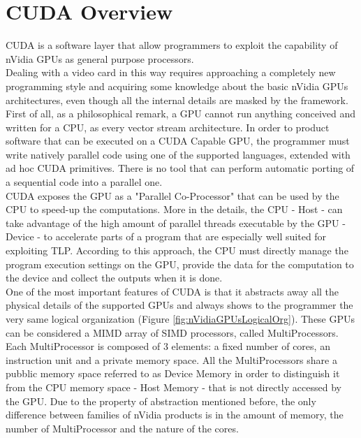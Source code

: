 \chapter{CUDA Overview}\label{sec:i}
CUDA is a software layer that allow programmers to exploit the capability of nVidia GPUs as general purpose processors.\\
Dealing with a video card in this way requires approaching a completely new programming style and acquiring some knowledge about the basic nVidia GPUs architectures, even though all the internal details are masked by the framework.\\
First of all, as a philosophical remark, a GPU cannot run anything conceived and written for a CPU, as every vector stream architecture. In order to product software that can be executed on a CUDA Capable GPU, the programmer must write natively parallel code using one of the supported languages, extended with ad hoc CUDA primitives. There is no tool that can perform automatic porting of a sequential code into a parallel one.\\
CUDA exposes the GPU as a "Parallel Co-Processor" that can be used by the CPU to speed-up the computations. More in the details, the CPU - Host - can take advantage of the high amount of parallel threads executable by the GPU - Device - to accelerate parts of a program that are especially well suited for exploiting TLP. According to this approach, the CPU must directly manage the program execution settings on the GPU, provide the data for the computation to the device and collect the outputs when it is done.\\
One of the most important features of CUDA is that it abstracts away all the physical details of the supported GPUs and always shows to the programmer  the very same logical organization (Figure \ref{fig:nVidiaGPUsLogicalOrg}). These GPUs can be considered a MIMD array of SIMD processors, called MultiProcessors. Each MultiProcessor is composed of 3 elements: a fixed number of cores, an instruction unit and a private memory space. All the MultiProcessors share a pubblic memory space referred to as Device Memory in order to distinguish it from the CPU memory space - Host Memory - that is not directly accessed by the GPU. Due to the property of abstraction mentioned before, the only difference between families of nVidia products is in the amount of memory, the number of MultiProcessor and the nature of the cores.\\

